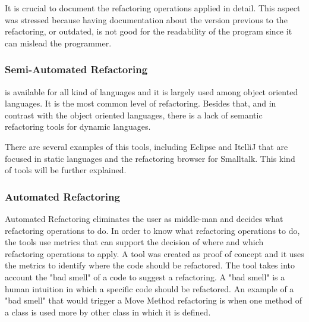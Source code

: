 It is crucial to document the refactoring operations applied in detail. 
This aspect was stressed because having documentation about the version previous to the refactoring, or outdated, is not good for the readability of the program since it can mislead the programmer.








\subsubsection{Semi-Automated Refactoring}

 is available for all kind of languages and it is largely used among object oriented languages.
It is the most common level of refactoring.
Besides that, and in contrast with the object oriented languages, there is a lack of semantic refactoring tools for dynamic languages.

There are several examples of this tools, including Eclipse and ItelliJ that are focused in static languages and the refactoring browser for Smalltalk.
This kind of tools will be further explained. 

\subsubsection{Automated Refactoring}
Automated Refactoring eliminates the user as middle-man and decides what refactoring operations to do.
In order to know what refactoring operations to do, the tools use metrics that can support the decision of where and which refactoring operations to apply. 
A tool\cite{simon2001metrics} was created as proof of concept and it uses the metrics to identify where the code should be refactored.
The tool takes into account the "bad smell" of a code to suggest a refactoring. 
A "bad smell" is a human intuition in which a specific code should be refactored. 
An example of a "bad smell" that would trigger a Move Method refactoring is when one method of a class is used more by other class in which it is defined.

